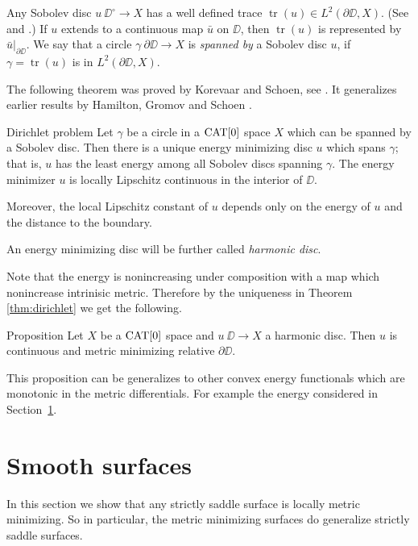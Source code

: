 \documentclass{article}
\begin{document}
Any Sobolev disc $u\:\DD^\circ\to X$ has a well defined trace $\operatorname{tr}(u)\in L^2(\partial\DD,X)$. 
(See \cite{KS} and \cite{LW}.)
If $u$ extends to a continuous map $\bar u$ on $\DD$, then $\operatorname{tr}(u)$ is represented by $\bar u|_{\partial\DD}$. 
We say that a circle $\gamma\:\partial\DD\to X$ is {\em spanned by} a Sobolev disc $u$, if $\gamma=\operatorname{tr}(u)$ is in 
$L^2(\partial\DD,X)$.

The following theorem was proved by Korevaar and Schoen,
see \cite[theorems 2.2 and 2.4.6]{KS}. 
It generalizes earlier results by Hamilton, Gromov and Schoen  \cite{H,GS}.

\begin{thm}{Dirichlet problem}\label{thm:dirichlet}
Let $\gamma$ be a circle in a $\mathop{\rm CAT}\nolimits[0]$ space $X$ which can be spanned by a Sobolev disc. 
Then there is a unique energy minimizing disc $u$ which spans $\gamma$; 
that is, $u$
has the least energy among all Sobolev discs spanning $\gamma$. 
The energy minimizer $u$ is locally Lipschitz continuous in the interior of $\DD$.

Moreover, the local Lipschitz constant of $u$ depends only on the energy of $u$ and the distance to the boundary.
\end{thm}

An energy minimizing disc will be further called \emph{harmonic disc}.

Note that the energy is nonincreasing under composition with a map which nonincrease intrinisic metric.
Therefore by the uniqueness in Theorem \ref{thm:dirichlet} we get the following.

\begin{thm}{Proposition}\label{prop:harmonic}
Let $X$ be a $\mathop{\rm CAT}\nolimits[0]$ space 
and $u\:\DD\to X$ a harmonic disc.
Then $u$ is continuous and metric minimizing relative $\partial\DD$.
\end{thm}

This proposition can be generalizes to other convex energy functionals which are monotonic in the metric differentials.
For example the energy considered in Section~\ref{sec:smooth}.

\section{Smooth surfaces}\label{sec:smooth}

In this section we show that any strictly saddle surface is locally metric minimizing.
So in particular, the metric minimizing surfaces do generalize strictly saddle surfaces.
\end{document}
